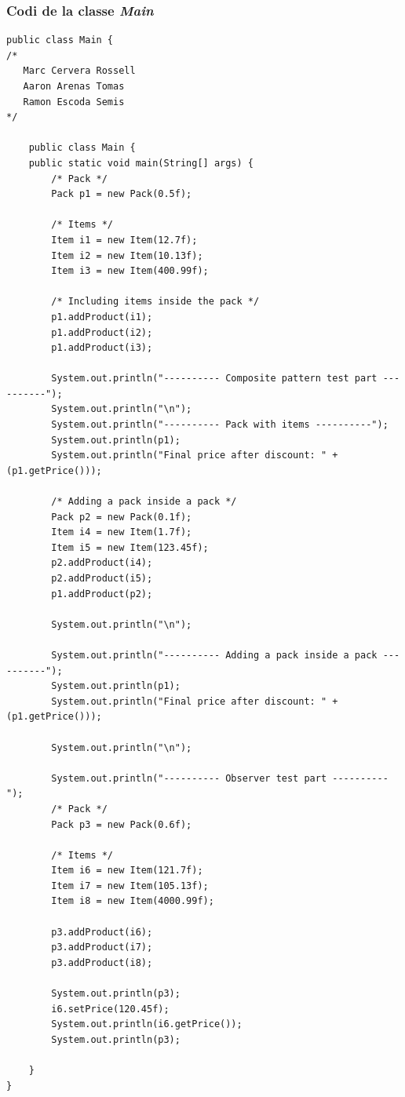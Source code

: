 \documentclass[a4paper,12pt]{article}
\begin{document}
\subsubsection{Codi de la classe \textit{Main}}
\begin{lstlisting}
public class Main {
/* 
   Marc Cervera Rossell
   Aaron Arenas Tomas
   Ramon Escoda Semis
*/

    public class Main {
    public static void main(String[] args) {
        /* Pack */
        Pack p1 = new Pack(0.5f);

        /* Items */
        Item i1 = new Item(12.7f);
        Item i2 = new Item(10.13f);
        Item i3 = new Item(400.99f);

        /* Including items inside the pack */
        p1.addProduct(i1);
        p1.addProduct(i2);
        p1.addProduct(i3);

        System.out.println("---------- Composite pattern test part ----------");
        System.out.println("\n");
        System.out.println("---------- Pack with items ----------");
        System.out.println(p1);
        System.out.println("Final price after discount: " + (p1.getPrice()));

        /* Adding a pack inside a pack */
        Pack p2 = new Pack(0.1f);
        Item i4 = new Item(1.7f);
        Item i5 = new Item(123.45f);
        p2.addProduct(i4);
        p2.addProduct(i5);
        p1.addProduct(p2);

        System.out.println("\n");

        System.out.println("---------- Adding a pack inside a pack ----------");
        System.out.println(p1);
        System.out.println("Final price after discount: " + (p1.getPrice()));

        System.out.println("\n");

        System.out.println("---------- Observer test part ----------");
        /* Pack */
        Pack p3 = new Pack(0.6f);

        /* Items */
        Item i6 = new Item(121.7f);
        Item i7 = new Item(105.13f);
        Item i8 = new Item(4000.99f);

        p3.addProduct(i6);
        p3.addProduct(i7);
        p3.addProduct(i8);

        System.out.println(p3);
        i6.setPrice(120.45f);
        System.out.println(i6.getPrice());
        System.out.println(p3);

    }
}
\end{lstlisting}
\end{document}
